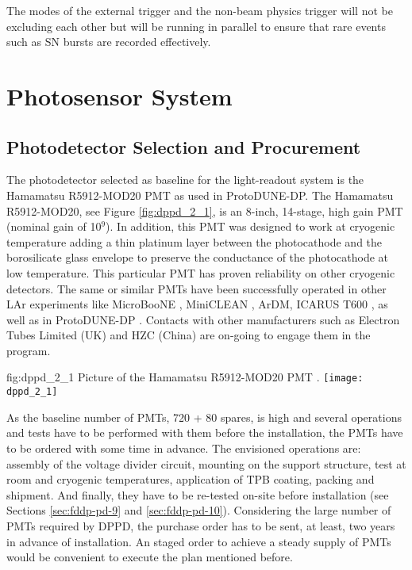 The modes of the external trigger and the non-beam physics trigger will not be excluding each other but will be running in parallel to ensure that rare events such as SN bursts are recorded effectively.

\section{Photosensor System}
\label{sec:fddp-pd-2}

\subsection{Photodetector Selection and Procurement}
\label{sec:fddp-pd-2.1}

The photodetector selected as baseline for the light-readout system is the Hamamatsu R5912-MOD20 PMT as used in ProtoDUNE-DP. The Hamamatsu R5912-MOD20, see Figure \ref{fig:dppd_2_1}, is an 8-inch, 14-stage, high gain PMT (nominal gain of \num{10}$^9$). In addition, this PMT was designed to work at cryogenic temperature adding a thin platinum layer between the photocathode and the borosilicate glass envelope to preserve the conductance of the photocathode at low temperature. This particular PMT has proven reliability on other cryogenic detectors. The same or similar PMTs have been successfully operated in other LAr experiments like MicroBooNE \cite{microboone}, MiniCLEAN \cite{miniclean}, ArDM, ICARUS T600 \cite{icarus}, as well as in ProtoDUNE-DP \cite{protoDUNDP-tdr}. Contacts with other manufacturers such as Electron Tubes Limited (UK) \cite{electrontubeslim} and HZC (China) \cite{hzc} are on-going to engage them in the program.

\begin{dunefigure}{fig:dppd_2_1}
{Picture of the Hamamatsu R5912-MOD20 PMT \cite{hamamatsu-5912}.}
\texttt{[image: dppd\_2\_1]}
\end{dunefigure}

As the baseline number of PMTs, \num{720} + \num{80} spares, is high and several operations and tests have to be performed with them before the installation, the PMTs have to be ordered with some time in advance. The envisioned operations are: assembly of the voltage divider circuit, mounting on the support structure, test at room and cryogenic temperatures, application of TPB coating, packing and shipment. And finally, they have to be re-tested on-site before installation (see Sections \ref{sec:fddp-pd-9} and \ref{sec:fddp-pd-10}). Considering the large number of PMTs required by DPPD, the purchase order has to be sent, at least, two years in advance of installation. An staged order to achieve a steady supply of PMTs would be convenient to execute the plan mentioned before. 

